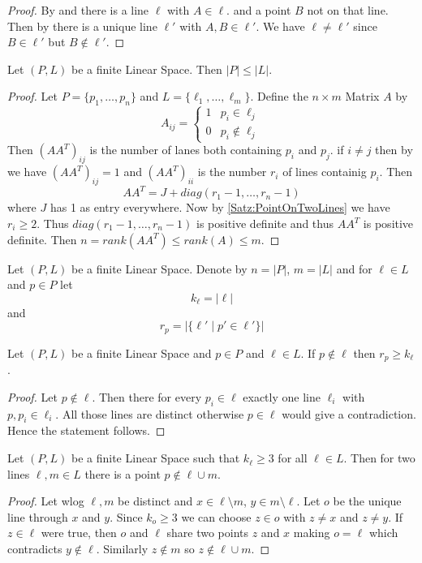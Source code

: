 \begin{proof}
By   and  there is a line \(\ell\) with \(A\in \ell\). 
and a point \(B\) not on that line.
Then by  there is a unique line \(\ell'\) with \(A,B\in \ell'\). 
We have \(\ell\neq \ell'\) since \(B\in\ell'\) but \(B\not\in\ell'\).
\end{proof}
\begin{Satz}
Let \((P,L)\) be a finite Linear Space. Then 
\(|P|\leq |L|\).
\end{Satz}
\begin{proof}
Let \(P=\{p_1,\dots,p_n\}\) and \(L=\{\ell_1,\dots,\ell_m\}\). 
Define the \(n\times m\) Matrix \(A\) by 
\[A_{ij}=\begin{cases} 1 & p_i\in \ell_j\\
    0 & p_i\not\in \ell_j
\end{cases}\] 
Then \((AA^T)_{ij}\) is the number of lanes both containing \(p_i\) and \(p_j\).
if \(i\neq j\) then by  we have \((AA^T)_{ij}=1\) and 
\((AA^T)_{ii}\) is the number \(r_i\) of lines containig \(p_i\). 
Then 
\[AA^T=J+diag(r_1-1,\dots,r_n-1)\] where \(J\) has 1 as entry everywhere.
Now by \cref{Satz:PointOnTwoLines} we have \(r_i\geq 2\). 
Thus \(diag(r_1-1,\dots,r_n-1)\) is positive definite and thus 
\(AA^T\) is positive definite.
Then \(n=rank(AA^T)\leq rank(A)\leq m\).
\end{proof}
\begin{Def}
Let \((P,L)\) be a finite Linear Space.
Denote by \(n=|P|\), \(m=|L|\) and for \(\ell\in L\) and \(p\in P\) let 
\[k_\ell=|\ell|\] and \[r_p=|\{\ell'\mid p'\in \ell'\}|\]
\end{Def}
\begin{Satz}
Let \((P,L)\) be a finite Linear Space and \(p\in P\) and \(\ell\in L\). 
If \(p\not\in \ell\) then \(r_p\geq k_\ell\).
\end{Satz}
\begin{proof}
Let \(p\not\in\ell\). 
Then there for every \(p_i\in \ell\) exactly one line 
\(\ell_i\) with \(p,p_i\in \ell_i\). All those lines are distinct otherwise
\(p\in \ell\) would give a contradiction.
Hence the statement follows.
\end{proof}
\begin{Satz}
    Let \((P,L)\) be a finite Linear Space such that 
    \(k_\ell\geq 3\) for all \(\ell\in L\). 
    Then for two lines \(\ell,m\in L\) there is a point 
    \(p\not\in \ell\cup m\).
\end{Satz}
\begin{proof}
    Let wlog \(\ell,m\) be distinct and \(x\in \ell\setminus m\), 
    \(y\in m\setminus \ell\).
    Let \(o\) be the unique line through \(x\) and \(y\).
    Since \(k_o\geq 3\) we can choose \(z\in o\) with \(z\neq x\) and \(z\neq y\).
    If \(z\in\ell\) were true, then \(o\) and \(\ell\) share 
    two points \(z\) and \(x\) making \(o=\ell\) which contradicts \(y\not\in\ell\).
    Similarly \(z\not\in m\) so \(z\not\in\ell\cup m\).
\end{proof}

